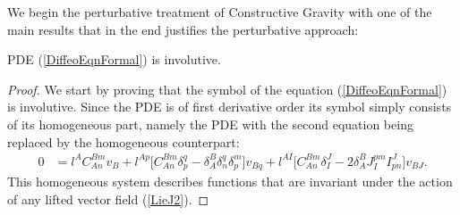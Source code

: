 We begin the perturbative treatment of Constructive Gravity with one of the main results that in the end justifies the perturbative approach:
\begin{theorem}
PDE (\ref{DiffeoEqnFormal}) is involutive.
\end{theorem}
\begin{proof}
We start by proving that the symbol of the equation (\ref{DiffeoEqnFormal}) is involutive. Since the PDE is of first derivative order its symbol simply consists of its homogeneous part, namely the PDE with the second equation being replaced by the homogeneous counterpart:
\begin{align}
    0 &= l^{A} C_{An}^{Bm} v_B + l^{Ap} \bigl[ C_{An}^{Bm} \delta_p^q -  \delta_A^B \delta_n^q\delta^m_p \bigr] v_{Bq} + l^{AI} \bigl[ C_{An}^{Bm} \delta_I^J - 2 \delta_A^B J_I^{pm} I^J_{pn}  \bigr] v_{BJ}.
\end{align}
This homogeneous system describes functions that are invariant under the action of any lifted vector field (\ref{LieJ2}). 


\end{proof}
